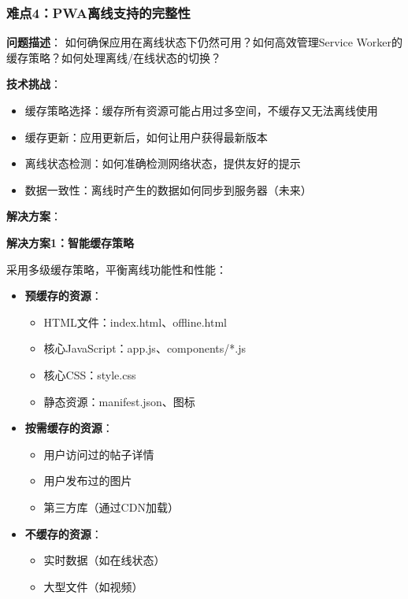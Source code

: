 \documentclass[12pt,a4paper]{article}
\begin{document}
\subsubsection{难点4：PWA离线支持的完整性}

\textbf{问题描述}：
如何确保应用在离线状态下仍然可用？如何高效管理Service Worker的缓存策略？如何处理离线/在线状态的切换？

\textbf{技术挑战}：
\begin{itemize}
    \item 缓存策略选择：缓存所有资源可能占用过多空间，不缓存又无法离线使用
    \item 缓存更新：应用更新后，如何让用户获得最新版本
    \item 离线状态检测：如何准确检测网络状态，提供友好的提示
    \item 数据一致性：离线时产生的数据如何同步到服务器（未来）
\end{itemize}

\textbf{解决方案}：

\textbf{解决方案1：智能缓存策略}

采用多级缓存策略，平衡离线功能性和性能：

\begin{itemize}
    \item \textbf{预缓存的资源}：
        \begin{itemize}
            \item HTML文件：index.html、offline.html
            \item 核心JavaScript：app.js、components/*.js
            \item 核心CSS：style.css
            \item 静态资源：manifest.json、图标
        \end{itemize}
    \item \textbf{按需缓存的资源}：
        \begin{itemize}
            \item 用户访问过的帖子详情
            \item 用户发布过的图片
            \item 第三方库（通过CDN加载）
        \end{itemize}
    \item \textbf{不缓存的资源}：
        \begin{itemize}
            \item 实时数据（如在线状态）
            \item 大型文件（如视频）
        \end{itemize}
\end{itemize}
\end{document}
